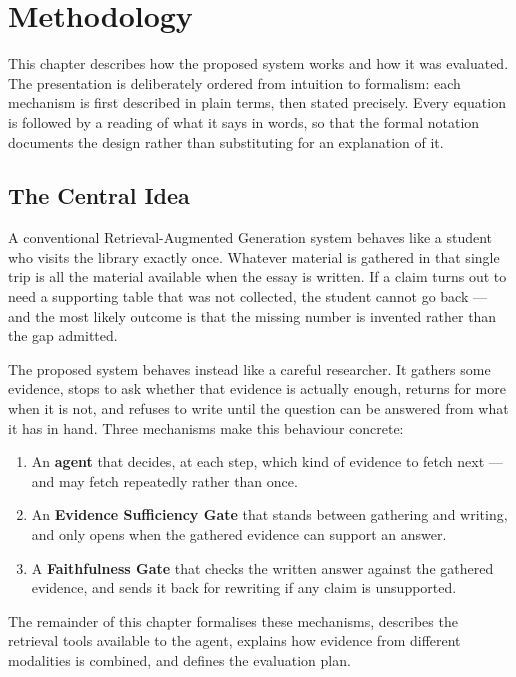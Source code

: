 \chapter{Methodology}
\label{sec:methodology}

This chapter describes how the proposed system works and how it was evaluated.
The presentation is deliberately ordered from intuition to formalism: each mechanism
is first described in plain terms, then stated precisely. Every equation is followed
by a reading of what it says in words, so that the formal notation documents the
design rather than substituting for an explanation of it.

\section{The Central Idea}

A conventional Retrieval-Augmented Generation system behaves like a student who
visits the library exactly once. Whatever material is gathered in that single trip
is all the material available when the essay is written. If a claim turns out to
need a supporting table that was not collected, the student cannot go back --- and
the most likely outcome is that the missing number is invented rather than the gap
admitted.

The proposed system behaves instead like a careful researcher. It gathers some
evidence, stops to ask whether that evidence is actually enough, returns for more
when it is not, and refuses to write until the question can be answered from what it
has in hand. Three mechanisms make this behaviour concrete:

\begin{enumerate}
    \item An \textbf{agent} that decides, at each step, which kind of evidence to
    fetch next --- and may fetch repeatedly rather than once.
    \item An \textbf{Evidence Sufficiency Gate} that stands between gathering and
    writing, and only opens when the gathered evidence can support an answer.
    \item A \textbf{Faithfulness Gate} that checks the written answer against the
    gathered evidence, and sends it back for rewriting if any claim is unsupported.
\end{enumerate}

The remainder of this chapter formalises these mechanisms, describes the
retrieval tools available to the agent, explains how evidence from different
modalities is combined, and defines the evaluation plan.

